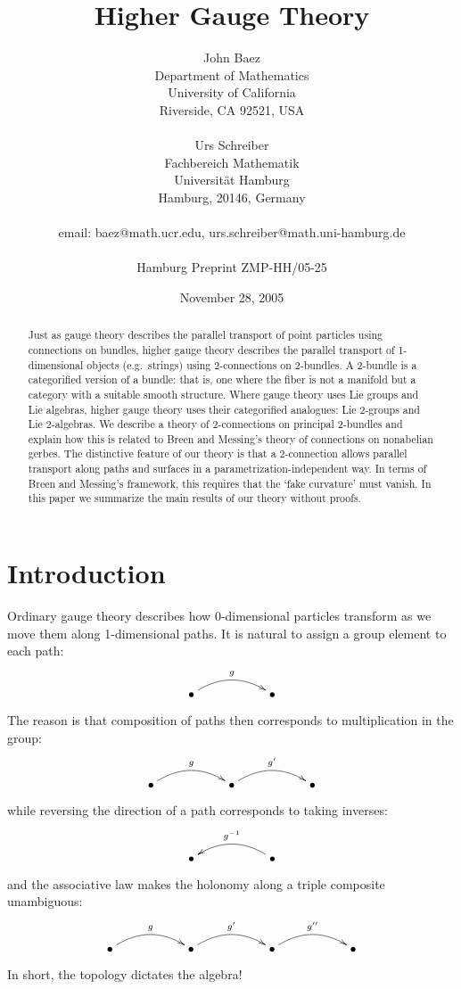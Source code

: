 \documentclass{article}
\title{Higher Gauge Theory}
\author{John Baez
\\ Department of Mathematics
\\ University of California
\\ Riverside, CA 92521, USA 
\\
\\ Urs Schreiber 
\\ Fachbereich Mathematik
\\ Universit{\"a}t Hamburg
\\ Hamburg, 20146, Germany
\\
\\ {\small email: baez@math.ucr.edu,
    urs.schreiber@math.uni-hamburg.de}
\\
\\ {\small Hamburg Preprint ZMP-HH/05-25}
}
\date{{\small November 28, 2005}}
\begin{document}
\maketitle


\begin{abstract}
\noindent
  Just as gauge theory describes the parallel transport of point
  particles using connections on bundles, higher gauge theory 
  describes the parallel transport of 1-dimensional objects (e.g.\
  strings) using 2-connections on 2-bundles.  A 2-bundle is a 
  categorified version of a bundle: that is, one where the fiber
  is not a manifold but a category with a suitable smooth structure.
  Where gauge theory uses Lie groups and Lie algebras, higher gauge
  theory uses their categorified analogues: Lie 2-groups and Lie 2-algebras.
  We describe a theory of 2-connections on principal 2-bundles and 
  explain how this is related to Breen and Messing's theory of connections
  on nonabelian gerbes.  The distinctive feature of our theory is that
  a 2-connection allows parallel transport along paths and surfaces 
  in a parametrization-independent way.  In terms of Breen and Messing's 
  framework, this requires that the `fake curvature' must vanish.
  In this paper we summarize the main results of our theory without
  proofs.
\end{abstract}



\section{Introduction}
\label{section: Introduction}

Ordinary gauge theory describes how 0-dimensional particles
transform as we move them along 1-dimensional
paths.  It is natural to assign a group element to 
each path:
\[
\xymatrix{
   \bullet \ar@/^1pc/[rr]^{g}
&& \bullet
}
\]
The reason is that composition of paths then corresponds to
multiplication in the group:
\[
\xymatrix{
   \bullet \ar@/^1pc/[rr]^{g}
&& \bullet \ar@/^1pc/[rr]^{g'}
&& \bullet
}
\]
while reversing the direction of a path corresponds to taking
inverses:
\[
\xymatrix{
   \bullet
&& \bullet \ar@/_1pc/[ll]_{g^{-1}}
}
\]
and the associative law makes the holonomy along a triple
composite unambiguous:
\[
\xymatrix{
   \bullet \ar@/^1pc/[rr]^{g}
&& \bullet \ar@/^1pc/[rr]^{g'}
&& \bullet \ar@/^1pc/[rr]^{g''}
&& \bullet
}
\]
In short, the topology dictates the algebra!
\end{document}
